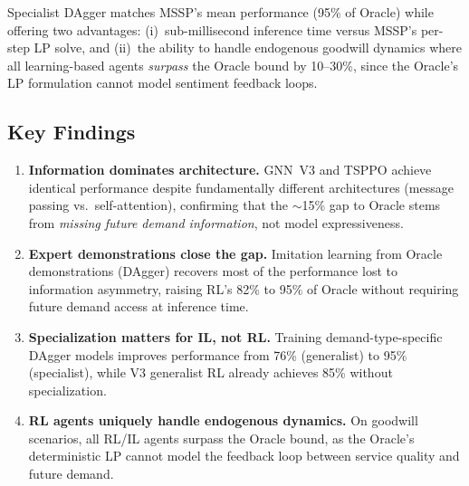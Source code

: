 Specialist DAgger matches MSSP's mean performance (95\% of Oracle) while offering two advantages: (i)~sub-millisecond inference time versus MSSP's per-step LP solve, and (ii)~the ability to handle endogenous goodwill dynamics where all learning-based agents \emph{surpass} the Oracle bound by 10--30\%, since the Oracle's LP formulation cannot model sentiment feedback loops.

\subsection{Key Findings}

\begin{enumerate}
    \item \textbf{Information dominates architecture.} GNN~V3 and TSPPO achieve identical performance despite fundamentally different architectures (message passing vs.\ self-attention), confirming that the $\sim$15\% gap to Oracle stems from \emph{missing future demand information}, not model expressiveness.
    
    \item \textbf{Expert demonstrations close the gap.} Imitation learning from Oracle demonstrations (DAgger) recovers most of the performance lost to information asymmetry, raising RL's 82\% to 95\% of Oracle without requiring future demand access at inference time.
    
    \item \textbf{Specialization matters for IL, not RL.} Training demand-type-specific DAgger models improves performance from 76\% (generalist) to 95\% (specialist), while V3 generalist RL already achieves 85\% without specialization.
    
    \item \textbf{RL agents uniquely handle endogenous dynamics.} On goodwill scenarios, all RL/IL agents surpass the Oracle bound, as the Oracle's deterministic LP cannot model the feedback loop between service quality and future demand.
\end{enumerate}
